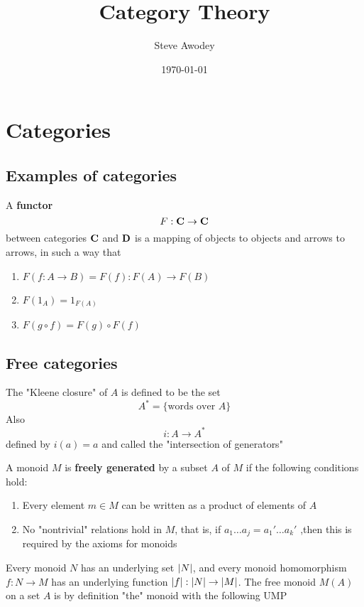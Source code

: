 \documentclass[11pt]{article}
\author{Steve Awodey}
\date{\today}
\title{Category Theory}
\begin{document}
\maketitle
\tableofcontents

\section{Categories}
\label{sec:org0821802}
\subsection{Examples of categories}
\label{sec:org1c07c55}
\begin{definition}[]
A \textbf{functor}
\begin{equation*}
F:\operatorname{\textbf{C}}\to\operatorname{\textbf{C}}
\end{equation*}
between categories \(\operatorname{\textbf{C}}\) and \(\operatorname{\textbf{D}}\) is a mapping of objects to objects and
arrows to arrows, in such a way that
\begin{enumerate}
\item \(F(f:A\to B)=F(f):F(A)\to F(B)\)
\item \(F(1_A)=1_{F(A)}\)
\item \(F(g\circ f)=F(g)\circ F(f)\)
\end{enumerate}
\end{definition}
\subsection{Free categories}
\label{sec:orgfbc560b}
The "Kleene closure" of \(A\) is defined to be the set
\begin{equation*}
A^*=\{\text{words over $A$}\}
\end{equation*}
Also
\begin{equation*}
i:A\to A^*
\end{equation*}
defined by \(i(a)=a\) and called the "intersection of generators"

A monoid \(M\) is \textbf{freely generated} by a subset \(A\) of \(M\) if the
following conditions hold:
\begin{enumerate}
\item Every element \(m\in M\) can be written as a product of elements of \(A\)
\item No "nontrivial" relations hold in \(M\), that is, if \(a_1\dots
      a_j=a_1'\dots a_k'\) ,then this is required by the axioms for monoids
\end{enumerate}


Every monoid \(N\) has an underlying set \(\abs{N}\), and every monoid
homomorphism \(f:N\to M\) has an underlying function
\(\abs{f}:\abs{N}\to\abs{M}\). The free monoid \(M(A)\) on a set \(A\) is by
definition "the" monoid with the following UMP
\end{document}
